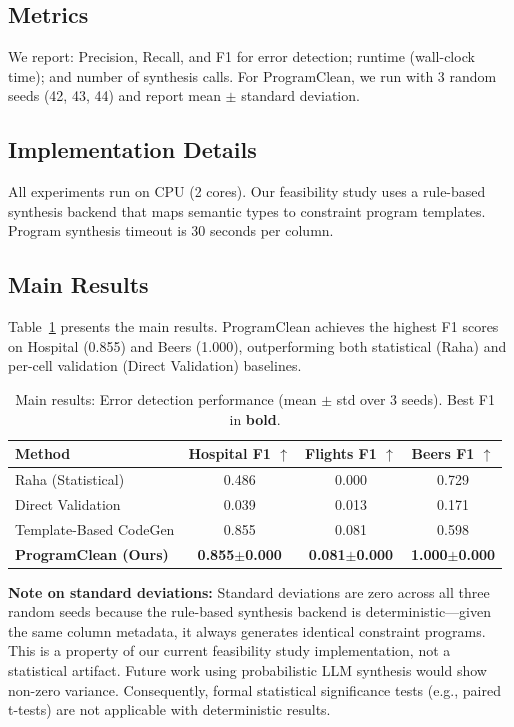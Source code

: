 \documentclass{article}
\begin{document}
\subsection{Metrics}

We report: Precision, Recall, and F1 for error detection; runtime (wall-clock time); and number of synthesis calls. For ProgramClean, we run with 3 random seeds (42, 43, 44) and report mean $\pm$ standard deviation.

\subsection{Implementation Details}

All experiments run on CPU (2 cores). Our feasibility study uses a rule-based synthesis backend that maps semantic types to constraint program templates. Program synthesis timeout is 30 seconds per column.

\subsection{Main Results}
\label{sec:main_results}

Table~\ref{tab:main_results} presents the main results. ProgramClean achieves the highest F1 scores on Hospital (0.855) and Beers (1.000), outperforming both statistical (Raha) and per-cell validation (Direct Validation) baselines.

\begin{table}[t]
\caption{Main results: Error detection performance (mean $\pm$ std over 3 seeds). Best F1 in \textbf{bold}.}
\label{tab:main_results}
\centering
\small
\begin{tabular}{lccc}
\toprule
Method & Hospital F1 $\uparrow$ & Flights F1 $\uparrow$ & Beers F1 $\uparrow$ \\
\midrule
Raha (Statistical) & 0.486 & 0.000 & 0.729 \\
Direct Validation & 0.039 & 0.013 & 0.171 \\
Template-Based CodeGen & 0.855 & 0.081 & 0.598 \\
\textbf{ProgramClean (Ours)} & \textbf{0.855$\pm$0.000} & \textbf{0.081$\pm$0.000} & \textbf{1.000$\pm$0.000} \\
\bottomrule
\end{tabular}
\end{table}

\textbf{Note on standard deviations:} Standard deviations are zero across all three random seeds because the rule-based synthesis backend is deterministic---given the same column metadata, it always generates identical constraint programs. This is a property of our current feasibility study implementation, not a statistical artifact. Future work using probabilistic LLM synthesis would show non-zero variance. Consequently, formal statistical significance tests (e.g., paired t-tests) are not applicable with deterministic results.
\end{document}
